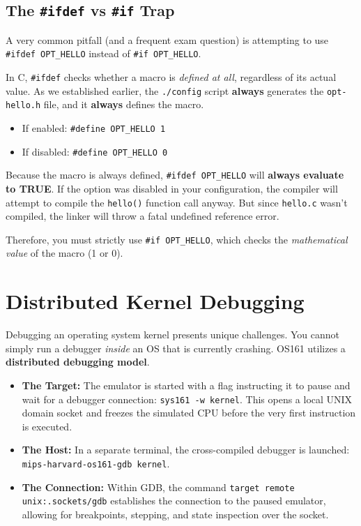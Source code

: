 \subsection*{The \texttt{\#ifdef} vs \texttt{\#if} Trap}
A very common pitfall (and a frequent exam question) is attempting to use \texttt{\#ifdef OPT\_HELLO} instead of \texttt{\#if OPT\_HELLO}. 

In C, \texttt{\#ifdef} checks whether a macro is \textit{defined at all}, regardless of its actual value. As we established earlier, the \texttt{./config} script \textbf{always} generates the \texttt{opt-hello.h} file, and it \textbf{always} defines the macro. 
\begin{itemize}
    \item If enabled: \texttt{\#define OPT\_HELLO 1}
    \item If disabled: \texttt{\#define OPT\_HELLO 0}
\end{itemize}
Because the macro is always defined, \texttt{\#ifdef OPT\_HELLO} will \textbf{always evaluate to TRUE}. If the option was disabled in your configuration, the compiler will attempt to compile the \texttt{hello()} function call anyway. But since \texttt{hello.c} wasn't compiled, the linker will throw a fatal undefined reference error. 

Therefore, you must strictly use \texttt{\#if OPT\_HELLO}, which checks the \textit{mathematical value} of the macro (1 or 0).

\section{Distributed Kernel Debugging}
Debugging an operating system kernel presents unique challenges. You cannot simply run a debugger \textit{inside} an OS that is currently crashing. OS161 utilizes a \textbf{distributed debugging model}. 

\begin{itemize}
    \item \textbf{The Target:} The emulator is started with a flag instructing it to pause and wait for a debugger connection: \texttt{sys161 -w kernel}. This opens a local UNIX domain socket and freezes the simulated CPU before the very first instruction is executed.
    \item \textbf{The Host:} In a separate terminal, the cross-compiled debugger is launched: \texttt{mips-harvard-os161-gdb kernel}. 
    \item \textbf{The Connection:} Within GDB, the command \texttt{target remote unix:.sockets/gdb} establishes the connection to the paused emulator, allowing for breakpoints, stepping, and state inspection over the socket.
\end{itemize}

